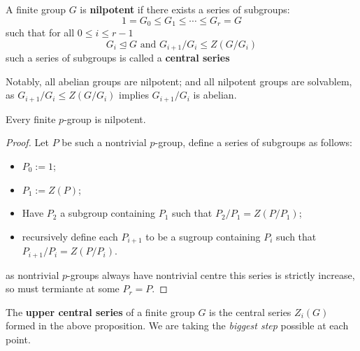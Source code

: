 \documentclass{article}
\begin{document}
\begin{definition}
    A finite group $G$ is \textbf{nilpotent} if there exists a series of subgroups: \[
    1 = G_0 \leq G_1 \leq \cdots \leq G_r = G\]
    such that for all $0\leq i \leq r-1$ \[
    G_i\unlhd G \text{ and } G_{i+1}/G_i \leq Z(G/G_i)
    \] such a series of subgroups is called a \textbf{central series}
\end{definition}

Notably, all abelian groups are nilpotent; and all nilpotent groups are solvablem, as $G_{i+1}/G_i\leq Z(G/G_i)$ implies $G_{i+1}/G_i$ is abelian.

\begin{proposition}
    Every finite $p$-group is nilpotent.
    \begin{proof}
        Let $P$ be such a nontrivial $p$-group, define a series of subgroups as follows:\begin{itemize}
            \item $P_0:= 1$;
            \item $P_1 := Z(P)$;
            \item Have $P_2$ a subgroup containing $P_1$ such that $P_2/P_1 = Z(P/P_1)$;
            \item recursively define each $P_{i+1}$ to be a sugroup containing $P_i$ such that $P_{i+1}/P_i = Z(P/P_i)$.
        \end{itemize}
        as nontrivial $p$-groups always have nontrivial centre this series is strictly increase, so must termiante at some $P_r=P$.
    \end{proof}
\end{proposition}

\begin{definition}
    The \textbf{upper central series} of a finite group $G$ is the central series $Z_i(G)$ formed in the above proposition. We are taking the \textit{biggest step} possible at each point.
\end{definition}
\end{document}
